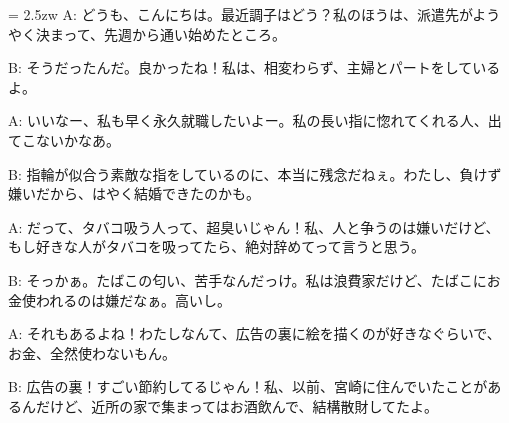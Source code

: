 \documentclass[11pt]{amsart}
\title{}
\author{}
\newenvironment{hangall}[1]{\hangindent = 2.5zw\everypar{\hangindent = 2.5zw}}{}
\begin{document}
\maketitle
\begin{hangall}{}%
A: どうも、こんにちは。最近調子はどう？私のほうは、派遣先がようやく決まって、先週から通い始めたところ。



B: そうだったんだ。良かったね！私は、相変わらず、主婦とパートをしているよ。



A: いいなー、私も早く永久就職したいよー。私の長い指に惚れてくれる人、出てこないかなあ。



B: 指輪が似合う素敵な指をしているのに、本当に残念だねぇ。わたし、負けず嫌いだから、はやく結婚できたのかも。



A: だって、タバコ吸う人って、超臭いじゃん！私、人と争うのは嫌いだけど、もし好きな人がタバコを吸ってたら、絶対辞めてって言うと思う。



B: そっかぁ。たばこの匂い、苦手なんだっけ。私は浪費家だけど、たばこにお金使われるのは嫌だなぁ。高いし。



A: それもあるよね！わたしなんて、広告の裏に絵を描くのが好きなぐらいで、お金、全然使わないもん。



B: 広告の裏！すごい節約してるじゃん！私、以前、宮崎に住んでいたことがあるんだけど、近所の家で集まってはお酒飲んで、結構散財してたよ。\end{hangall}
\end{document}
